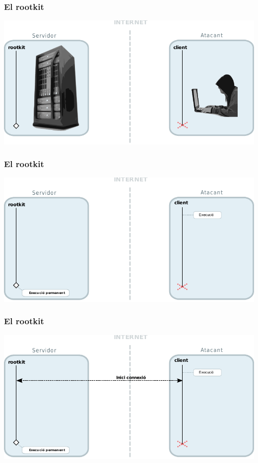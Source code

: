 \documentclass{beamer}
\begin{document}
\begin{frame}
	\frametitle{El rootkit}
	\includegraphics[scale=0.8,keepaspectratio]{arquitectura1.pdf}
\end{frame}

\begin{frame}
	\frametitle{El rootkit}
	\includegraphics[scale=0.8,keepaspectratio]{arquitectura2.pdf}
\end{frame}

\begin{frame}
	\frametitle{El rootkit}
	\includegraphics[scale=0.8,keepaspectratio]{arquitectura3.pdf}
\end{frame}
\end{document}
